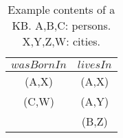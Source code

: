 \begin{table}
\centering
 \begin{tabular}{c|c}
  $wasBornIn$ & $livesIn$\\  \hline
  (A,X)		& (A,X) \\
  (C,W)		& (A,Y) \\
		& (B,Z) \\
 \end{tabular}
\caption{Example contents of a KB. A,B,C: persons. X,Y,Z,W: cities.}\label{tab:exampleKB}
\end{table}



%
